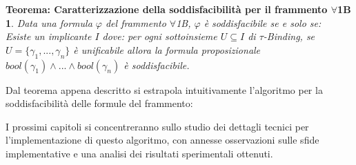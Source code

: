 \documentclass[./main.tex]{subfiles}
\begin{document}
\newtheorem{forall1bsat}[thm]{Teorema: Caratterizzazione della soddisfacibilità per il frammento $\forall$1B}
\begin{forall1bsat}
    Data una formula $\varphi$ del frammento $\forall$1B, $\varphi$ è soddisfacibile se e solo se: \\
    Esiste un implicante $I$ dove: per ogni sottoinsieme $U \subseteq I$ di $\tau$-Binding,
    se $U=\{\gamma_1, ..., \gamma_n\}$ è unificabile allora la formula proposizionale $bool(\gamma_1) \land ... \land bool(\gamma_n)$ è soddisfacibile.
\end{forall1bsat}

Dal teorema appena descritto si estrapola intuitivamente l'algoritmo per la soddisfacibilità delle formule del frammento:

\begin{algorithm}[H]
    \caption{Algoritmo per la soddisfacibilità del frammento $\forall$1B} \label{alg:1b}
  

    \Return{$\bot$}
  \end{algorithm}

I prossimi capitoli si concentreranno sullo studio dei dettagli tecnici per l'implementazione di questo algoritmo,
con annesse osservazioni sulle sfide implementative e una analisi dei risultati sperimentali ottenuti.
\end{document}
